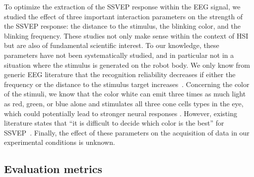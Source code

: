 \documentclass[smallextended]{svjour3}
\begin{document}
To optimize the extraction of the SSVEP response within the EEG signal, we studied the effect of three important interaction parameters on the strength of the SSVEP response: the distance to the stimulus, the blinking color, and the blinking frequency. 
These studies not only make sense within the context of HSI but are also of fundamental scientific interest. 
To our knowledge, these parameters have not been systematically studied, and in particular not in a situation where the stimulus is generated on the robot body. We only know from generic EEG literature that the recognition reliability decreases if either the frequency or the distance to the stimulus target increases~\cite{herrmann2001,wu2013effect}. 
Concerning the color of the stimuli, we know that the color white can emit three times as much light as red, green, or blue alone and stimulates all three cone cells types in the eye, which could potentially lead to stronger neural responses \cite{aljshamee2016discriminate,cao2012flashing}. 
However, existing literature states that ``it is difficult to decide which color is the best'' for SSVEP~\cite{Zhu2010}.
Finally, the effect of these parameters on the acquisition of data in our experimental conditions is unknown. 
\\
\subsection{Evaluation metrics}
\end{document}

